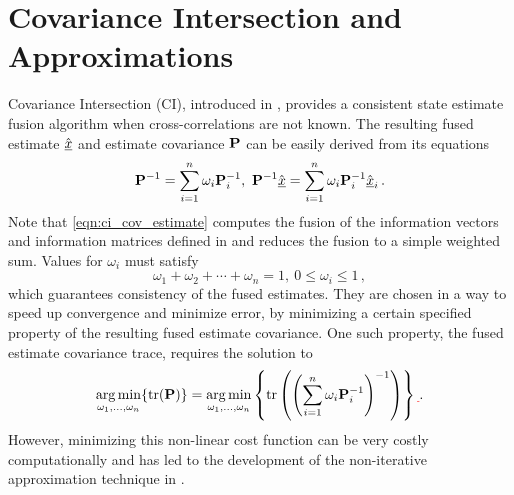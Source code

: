 \documentclass[letterpaper, 10 pt, conference]{ieeeconf}  %
\providecommand{\DIFdel}[1]{{\protect\color{red}\sout{#1}}}                      %
\providecommand{\DIFdelbegin}{} %
\providecommand{\DIFdelend}{} %
\begin{document}
\section{Covariance Intersection and Approximations} \label{sec:ci}
Covariance Intersection (CI), introduced in \cite{julierNondivergentEstimationAlgorithm1997}, provides a consistent state estimate fusion algorithm when cross-correlations are not known. The resulting fused estimate $\hat{{\underline{x}}}$ and estimate covariance ${{\mathbf{P}}}$ can be easily derived from its equations
\begin{equation}
   {\ensuremath{{\mathbf{P}}}}^{-1}=\sum_{i=1}^{n}\omega_i {{\mathbf{P}}}_i^{-1},\ {{\mathbf{P}}}^{-1} \hat{{\underline{x}}} =\sum_{i=1}^{n}\omega_i {{\mathbf{P}}}_i^{-1} \hat{{\underline{x}}}_i\,. \label{eqn:ci_cov_estimate}
\end{equation}
Note that \eqref{eqn:ci_cov_estimate} computes the fusion of the information vectors and information matrices defined in \cite{niehsenInformationFusionBased2002} and reduces the fusion to a simple weighted sum.
Values for $\omega_i$ must satisfy
\begin{equation}
   \omega_1 + \omega_2 + \cdots + \omega_n = 1,\ 0 \leq \omega_i \leq 1\,, \label{eqn:ci_omega_sum_bound}
\end{equation}
which guarantees consistency of the fused estimates. They are chosen in a way to speed up convergence and minimize error, by minimizing a certain specified property of the resulting fused estimate covariance. One such property, the fused estimate covariance trace, requires the solution to
\begin{equation}
   \argmin_{\omega_1,\dots,\omega_n} \{\tr(\mP)\} = \argmin_{\omega_1,\dots,\omega_n} \left\{\tr\left(\left(\sum_{i=1}^{n}\omega_i \mP_i^{-1}\right)^{-1}\right)\right\}\DIFdelbegin \DIFdel{\,}\DIFdelend . \label{eqn:ci_trace_min}
\end{equation}
However, minimizing this non-linear cost function can be very costly computationally and has led to the development of the non-iterative approximation technique in \cite{niehsenInformationFusionBased2002}.
\end{document}
